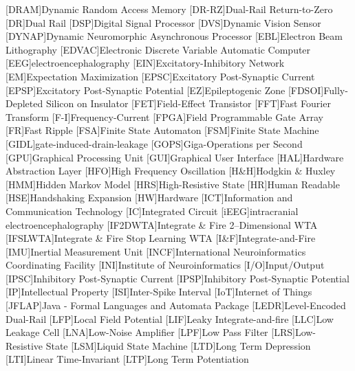 \begin{acronym}
[DRAM]{Dynamic Random Access Memory}
[DR-RZ]{Dual-Rail Return-to-Zero}
[DR]{Dual Rail}
[DSP]{Digital Signal Processor}
[DVS]{Dynamic Vision Sensor}
[DYNAP]{Dynamic Neuromorphic Asynchronous Processor}
[EBL]{Electron Beam Lithography}
[EDVAC]{Electronic Discrete Variable Automatic Computer}
[EEG]{electroencephalography}
[EIN]{Excitatory-Inhibitory Network}
[EM]{Expectation Maximization}
[EPSC]{Excitatory Post-Synaptic Current}
[EPSP]{Excitatory Post-Synaptic Potential}
[EZ]{Epileptogenic Zone}
[FDSOI]{Fully-Depleted Silicon on Insulator}
[FET]{Field-Effect Transistor}
[FFT]{Fast Fourier Transform}
[F-I]{Frequency-Current}
[FPGA]{Field Programmable Gate Array}
[FR]{Fast Ripple}
[FSA]{Finite State Automaton}
[FSM]{Finite State Machine}
[GIDL]{gate-induced-drain-leakage}
[GOPS]{Giga-Operations per Second}
[GPU]{Graphical Processing Unit}
[GUI]{Graphical User Interface}
[HAL]{Hardware Abstraction Layer}
[HFO]{High Frequency Oscillation}
[H\&H]{Hodgkin \& Huxley}
[HMM]{Hidden Markov Model}
[HRS]{High-Resistive State}
[HR]{Human Readable}
[HSE]{Handshaking Expansion}
[HW]{Hardware}
[ICT]{Information and Communication Technology}
[IC]{Integrated Circuit}
[iEEG]{intracranial electroencephalography}
[IF2DWTA]{Integrate \& Fire 2--Dimensional WTA}
[IFSLWTA]{Integrate \& Fire Stop Learning WTA}
[I\&F]{Integrate-and-Fire}
[IMU]{Inertial Measurement Unit}
[INCF]{International Neuroinformatics Coordinating Facility}
[INI]{Institute of Neuroinformatics}
[I/O]{Input/Output}
[IPSC]{Inhibitory Post-Synaptic Current}
[IPSP]{Inhibitory Post-Synaptic Potential}
[IP]{Intellectual Property}
[ISI]{Inter-Spike Interval}
[IoT]{Internet of Things}
[JFLAP]{Java - Formal Languages and Automata Package}
[LEDR]{Level-Encoded Dual-Rail}
[LFP]{Local Field Potential}
[LIF]{Leaky Integrate-and-fire}
[LLC]{Low Leakage Cell}
[LNA]{Low-Noise Amplifier}
[LPF]{Low Pass Filter}
[LRS]{Low-Resistive State}
[LSM]{Liquid State Machine}
[LTD]{Long Term Depression}
[LTI]{Linear Time-Invariant}
[LTP]{Long Term Potentiation}

\end{acronym}
